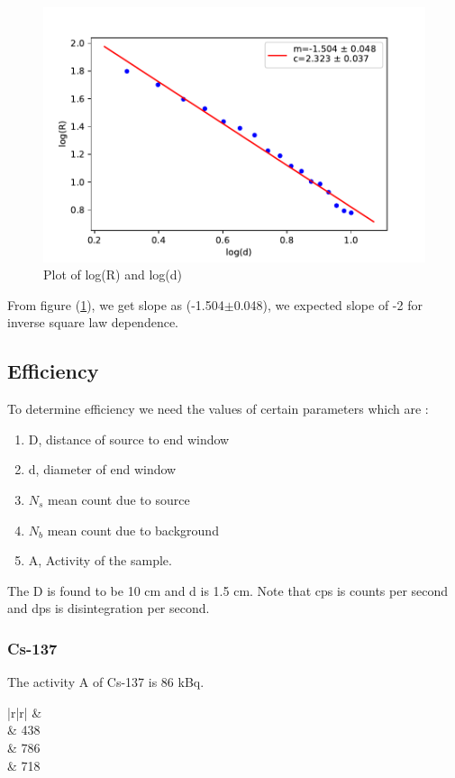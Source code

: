 \documentclass[a4paper, amsfonts, amssymb, amsmath, reprint, showkeys, nofootinbib, twoside]{revtex4-1}
\begin{document}
\begin{figure}[H]
	\centering
	\includegraphics[scale=0.5]{i3}
	\caption{Plot of log(R) and log(d)}
	\label{i3}
\end{figure}

From figure (\ref{i3}), we get slope as (-1.504$\pm$0.048), we expected slope of -2 for inverse square law dependence.


\subsection{Efficiency}
To determine efficiency we need the values of certain parameters which are :
\begin{enumerate}
	\item D, distance of source to end window
	\item d, diameter of end window
	\item $N_s$ mean count due to source
	\item $N_b$ mean count due to background 
	\item A, Activity of the sample.
\end{enumerate}

The D is found to be 10 cm and d is 1.5 cm. Note that cps is counts per second and dps is disintegration per second.

\subsubsection{Cs-137}
The activity A of Cs-137 is 86 kBq.

\begin{table}[H]
	\centering
	\caption{Background count and count recording for 100 s for Cs-137}
	\label{te1}
		\begin{tabular}{|r|r|}
			\hline
			 &  \\  & 438 \\  & 786 \\  & 718 \\ \hline
		\end{tabular}
\end{table}
\end{document}
